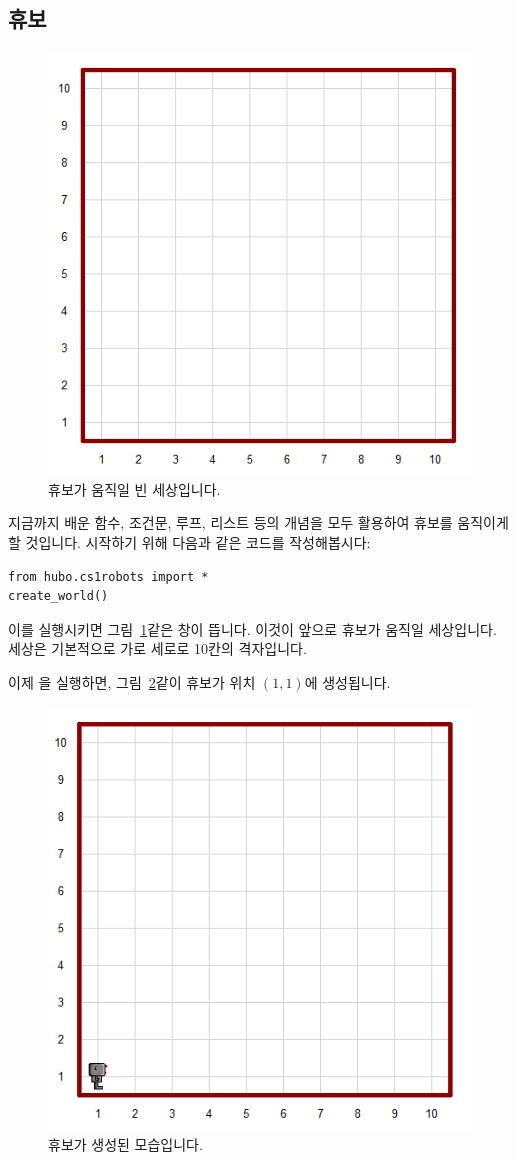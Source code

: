 \documentclass[../main.tex]{subfiles}
\begin{document}
\subsection{휴보}
\begin{figure}[htbp]
\centering
\includegraphics[width=0.5\linewidth]{"./lectures/lecture4_emptyworld"}
\caption{휴보가 움직일 빈 세상입니다.}\label{fig:lecture4:emptyworld}
\end{figure}

지금까지 배운 함수, 조건문, 루프, 리스트 등의 개념을 모두 활용하여 휴보를 움직이게 할 것입니다.
시작하기 위해 다음과 같은 코드를 작성해봅시다:
\begin{verbatim}
from hubo.cs1robots import *
create_world()
\end{verbatim}
이를 실행시키면 그림~\ref{fig:lecture4:emptyworld}\와 같은 창이 뜹니다.
이것이 앞으로 휴보가 움직일 세상입니다.
세상은 기본적으로 가로 세로로 10칸의 격자입니다.

이제 을 실행하면, 그림~\ref{fig:lecture4:hubo}\와 같이 휴보가 위치 $(1, 1)$에 생성됩니다.
\begin{figure}[htbp]
\centering
\includegraphics[width=0.5\linewidth]{"./lectures/lecture4_hubo"}
\caption{휴보가 생성된 모습입니다.}\label{fig:lecture4:hubo}
\end{figure}
\end{document}
